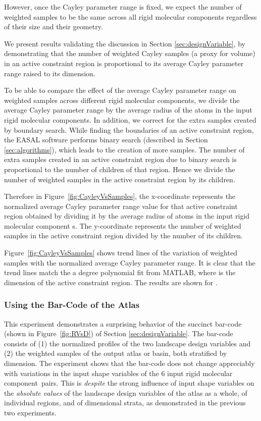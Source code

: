 \documentclass[]{article}
\newcommand{\figref}[1]{Figure~\ref{#1}}
\newcommand{\rmc}{rigid molecular component}
\begin{document}
However, once the Cayley parameter range is fixed, we expect the number of
weighted samples to be the same across all \rmc s regardless of their size and
their geometry.

We present results validating the discussion in Section
\ref{sec:designVariable}, by demonstrating that the number
of weighted Cayley samples (a proxy for volume) in an active constraint region
is proportional to its average Cayley parameter range raised to its dimension.

To be able to compare the effect of the average Cayley parameter range on
weighted samples across different \rmc s, we divide the average Cayley
parameter range by the average radius of the atoms in the input \rmc s.  In
addition, we correct for the extra samples created by boundary search.  While
finding the boundaries of an active constraint region, the EASAL software
performs binary search (described in Section \ref{sec:algorithms}), which leads
to the creation of more samples. The number of extra samples created in an
active constraint region due to binary search is proportional to the number of
children of that region. Hence we divide the number of weighted samples in the
active constraint region by its children.

Therefore in \figref{fig:CayleyVsSamples}, the x-coordinate represents the
normalized average Cayley parameter range value for that active constraint
region obtained by dividing it by the average radius of atoms in the input \rmc
s. The y-coordinate represents the number of weighted samples in the active
constraint region divided by the number of its children.

\figref{fig:CayleyVsSamples} shows trend lines of the variation of weighted
samples with the normalized average Cayley parameter range. It is clear that
the trend lines match the a  degree polynomial fit from MATLAB, where
 is the dimension of the active constraint region. The results are shown for
.


\subsubsection{Using the Bar-Code of the Atlas}
\label{sec:geometricBarCode}
This experiment demonstrates a surprising behavior of the succinct bar-code
(shown in \figref{fig:RVsD}) of Section \ref{sec:designVariable}. The bar-code
consists of (1) the normalized profiles of the two landscape design variables
and (2) the weighted samples of the output atlas or basin, both stratified by
dimension. The experiment shows that the bar-code does not change appreciably
with variations in the input shape variables of the 6 input \rmc\ pairs. This
is {\sl despite} the strong influence of input shape variables on the {\sl
absolute values} of the landscape design variables of the atlas as a whole, of
individual regions, and of dimensional strata, as demonstrated in the previous
two experiments.
\end{document}
